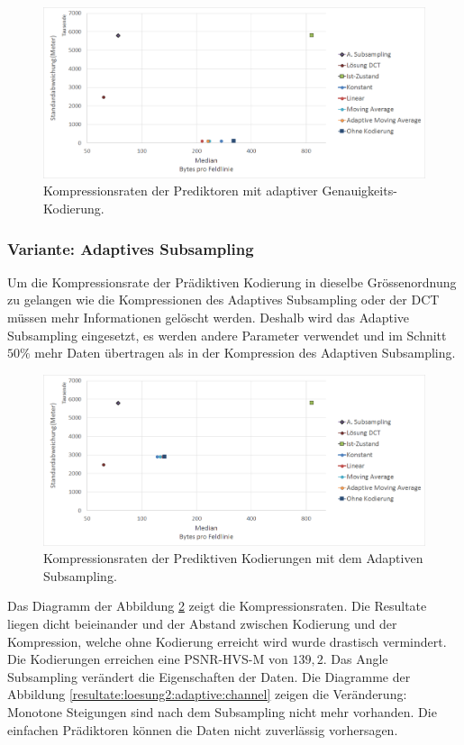 \begin{figure}[!htbp]
	\center
	\includegraphics[width=1\textwidth,keepaspectratio]{./pictures/resultate/loesung2/variante0/resultate_byte.png}
	\caption{Kompressionsraten der Prediktoren mit adaptiver Genauigkeits-Kodierung.}
	\label{resultate:loesung2:simple:resultate_byte}
\end{figure}


\subsubsection{Variante: Adaptives Subsampling} \label{resultate:loesung2:adaptive}
Um die Kompressionsrate der Prädiktiven Kodierung in dieselbe Grössenordnung zu gelangen wie die Kompressionen des Adaptives Subsampling oder der DCT müssen mehr Informationen gelöscht werden. Deshalb wird das Adaptive Subsampling eingesetzt, es werden andere Parameter verwendet und im Schnitt $50\%$ mehr Daten übertragen als in der Kompression des Adaptiven Subsampling.

\begin{figure}[!htbp]
	\center
	\includegraphics[width=1\textwidth,keepaspectratio]{./pictures/resultate/loesung2/variante1/resultate_euler.png}
	\caption{Kompressionsraten der Prediktiven Kodierungen mit dem Adaptiven Subsampling.}
	\label{resultate:loesung2:adaptive:euler}
\end{figure}
Das Diagramm der Abbildung \ref{resultate:loesung2:adaptive:euler} zeigt die Kompressionsraten. Die Resultate liegen dicht beieinander und der Abstand zwischen Kodierung und der Kompression, welche ohne Kodierung erreicht wird wurde drastisch vermindert. Die Kodierungen erreichen eine PSNR-HVS-M von $139,2$. Das Angle Subsampling verändert die Eigenschaften der Daten. Die Diagramme der Abbildung \ref{resultate:loesung2:adaptive:channel} zeigen die Veränderung: Monotone Steigungen sind nach dem Subsampling nicht mehr vorhanden. Die einfachen Prädiktoren können die Daten nicht zuverlässig vorhersagen.

